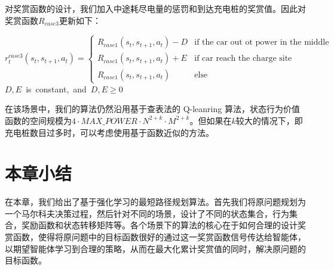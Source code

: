 \documentclass{standalone}
\begin{document}
对奖赏函数的设计，我们加入中途耗尽电量的惩罚和到达充电桩的奖赏值。因此对奖赏函数$R_{case3}$更新如下：
\begin{center}
    \begin{equation}
    \label{eq3reward}
    r_t^{case3}(s_t, s_{t+1}, a_t) = \begin{cases}
     R_{case1}(s_t, s_{t+1}, a_t) - D &\mbox{if the car out ot power in the middle}\\
     R_{case1}(s_t, s_{t+1}, a_t) + E&\mbox{if car reach the charge site}\\
     R_{case1}(s_t, s_{t+1}, a_t)&\mbox{else}
    \end{cases}
    \end{equation}
    \mbox{$D, E$ is constant, and $D, E \geq 0$}

\end{center}
在该场景中，我们的算法仍然沿用基于查表法的 Q-leanring 算法，状态行为价值函数的空间规模为$4\cdot MAX\_POWER\cdot N^{2+k} \cdot M^{2+k}$。但如果在$k$较大的情况下，即充电桩数目过多时，可以考虑使用基于函数近似的方法。
\section{本章小结}
在本章，我们给出了基于强化学习的最短路径规划算法。首先我们将原问题规划为一个马尔科夫决策过程，然后针对不同的场景，设计了不同的状态集合，行为集合，奖励函数和状态转移矩阵等。各个场景下的算法的核心在于如何合理的设计奖赏函数，使得将原问题中的目标函数很好的通过这一奖赏函数信号传达给智能体，以期望智能体学习到合理的策略，从而在最大化累计奖赏值的同时，解决原问题的目标函数。
\end{document}
